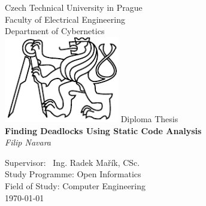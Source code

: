 \begin{titlepage}
\cleardoublepage
\thispagestyle{empty}
\begin{center}
\large\rmfamily
Czech Technical University in Prague\\
Faculty of Electrical Engineering\\
Department of Cybernetics\\
\vglue 10mm
\includegraphics[width=50mm]{LogoCVUT}
\vglue 30mm
{\large Diploma Thesis}\\
\bigskip
{\Large\bf Finding Deadlocks Using Static Code Analysis}\\
\bigskip
\bigskip
{\Large\it Filip Navara}\\
\vfill
\item[Supervisor:]\ Ing. Radek Mařík, CSc.\\
\vglue 15mm
{Study Programme: Open Informatics}\\
\bigskip
{Field of Study: Computer Engineering}\\
\bigskip
\today
\end{center}
\end{titlepage}